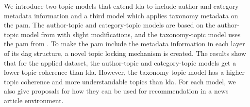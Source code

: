 We introduce two topic models that extend \gls{lda} to include author and category metadata information and a third model which applies taxonomy metadata on the \gls{pam}.
The author-topic and category-topic models are based on the author-topic model from \citet{author_topic_2012} with slight modifications, and the taxonomy-topic model uses the \gls{pam} from \citet{li2006pachinko}.
To make the \gls{pam} include the metadata information in each layer of its \gls{dag} structure, a novel topic locking mechanism is created.
The results show that for the applied dataset, the author-topic and category-topic models get a lower topic coherence than \gls{lda}.
However, the taxonomy-topic model has a higher topic coherence and more understandable topics than \gls{lda}.
For each model, we also give proposals for how they can be used for recommendation in a news article environment.
